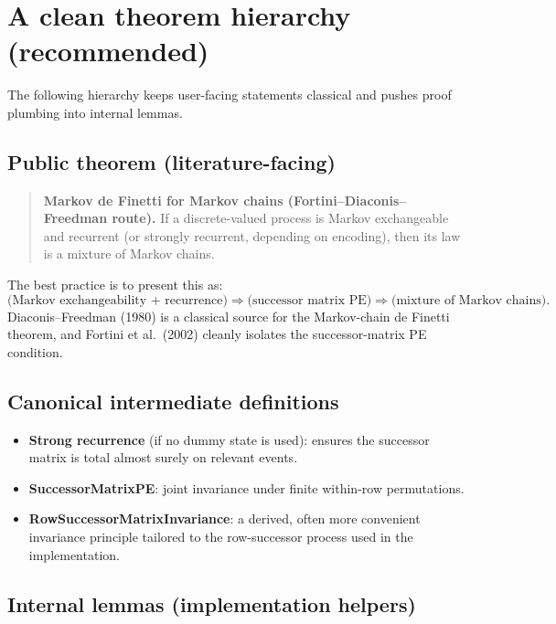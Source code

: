 \documentclass[11pt]{article}
\begin{document}
\section{A clean theorem hierarchy (recommended)}

The following hierarchy keeps user-facing statements classical and pushes proof plumbing into internal lemmas.

\subsection{Public theorem (literature-facing)}

\begin{quote}
\textbf{Markov de Finetti for Markov chains (Fortini--Diaconis--Freedman route).}
If a discrete-valued process is Markov exchangeable and recurrent (or strongly recurrent, depending on encoding),
then its law is a mixture of Markov chains.
\end{quote}

The best practice is to present this as:
\[
\text{(Markov exchangeability + recurrence)} \Rightarrow \text{(successor matrix PE)} \Rightarrow \text{(mixture of Markov chains).}
\]
Diaconis--Freedman (1980) is a classical source for the Markov-chain de Finetti theorem, and Fortini et al.\ (2002) cleanly isolates the successor-matrix PE condition. \cite{DiaconisFreedman1980,FortiniEtAl2002}

\subsection{Canonical intermediate definitions}

\begin{itemize}[leftmargin=2em]
\item \textbf{Strong recurrence} (if no dummy state is used): ensures the successor matrix is total almost surely on relevant events.
\item \textbf{SuccessorMatrixPE}: joint invariance under finite within-row permutations.
\item \textbf{RowSuccessorMatrixInvariance}: a derived, often more convenient invariance principle tailored to the row-successor process used in the implementation.
\end{itemize}

\subsection{Internal lemmas (implementation helpers)}
\end{document}
